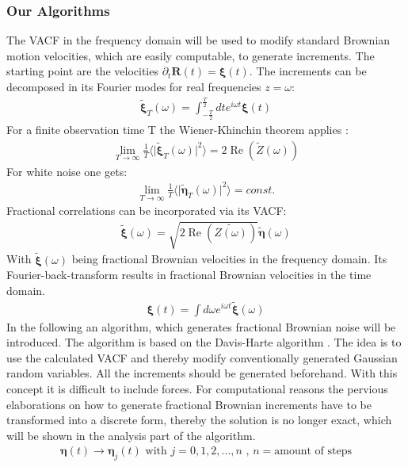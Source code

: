 \documentclass[
  a4paper,BCOR10mm,oneside,
  bibtotoc,idxtotoc,
  headsepline,footsepline,%
  fleqn,openbib
]{scrbook}
\begin{document}
\subsubsection{Our Algorithms}
The VACF in the frequency domain will be used to modify standard Brownian motion velocities, which are easily computable, to generate increments. The starting point are the velocities $\partial_t \bm{R}(t)=\bm{\xi}(t)$. The increments can be decomposed in its Fourier modes for real frequencies $z=\omega$:
\begin{align}
 \tilde{\bm{\xi}}_{T}(\omega)=\int_{-\frac{T}{2}}^{\frac{T}{2}} dt e^{i \omega t} \bm{\xi}(t) \label{eq:fourier}
\end{align}
For a finite observation time T the Wiener-Khinchin theorem applies :
\begin{align}
 \lim_{T\to\infty}\frac{1}{T}\langle \lvert  \tilde{\bm{\xi}}_{T}(\omega) \rvert^2  \rangle = 2  \operatorname{Re} \left(\tilde{Z}(\omega)\right)
\end{align}
For white noise one gets: 
\begin{align}
 \lim_{T\to\infty}\frac{1}{T}\langle \lvert  \tilde{\bm{\eta}}_{T}(\omega) \rvert^2 \rangle = const.
\end{align}
Fractional correlations can be incorporated via its VACF:
\begin{align}
\tilde{\bm{\xi}}(\omega) = \sqrt{2 \operatorname{Re} \left(\tilde{Z(\omega)}\right)}  \tilde{\bm{\eta}}(\omega) \label{eq:fracvacf}
\end{align}
 With $\tilde{\bm{\xi}}(\omega)$ being fractional Brownian velocities in the frequency domain. Its Fourier-back-transform results in fractional Brownian velocities in the time domain.
\begin{align}
\bm{\xi}(t)=\int d \omega e^{i \omega t} \tilde{\bm{\xi}}(\omega) \label{eq:fourier2}
\end{align}
In the following an algorithm, which generates fractional Brownian noise will be introduced. The algorithm is based on the Davis-Harte algorithm \cite{Craigmile2003}. The idea is to use the calculated VACF and thereby modify conventionally generated Gaussian random variables. All the increments should be generated beforehand. With this concept it is difficult to include forces. For computational reasons the pervious elaborations on how to generate fractional Brownian increments have to be transformed into a discrete form, thereby the solution is no longer exact, which will be shown in the analysis part of the algorithm.  
\begin{align}
\bm{\eta} (t) \longrightarrow \bm{\eta}_j(t)  \text{  with  } j=0,1,2,...,n  \text{  ,  } n= \text{amount of steps}
\end{align}
\end{document}
